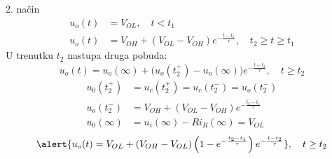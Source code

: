 \begin{frame}[label=08-s061]{2. način}
\setlength{\parskip}{2pt}
\setlength{\abovedisplayskip}{4pt}\setlength{\belowdisplayskip}{4pt}
\begin{align*}
u_o(t)&=V_{OL},\quad t<t_1\\
u_o(t)&=V_{OH}+(V_{OL}-V_{OH})e^{-\frac{t-t_1}{\tau}},\quad t_2\geq t\geq t_1
\end{align*}
U trenutku $t_2$ nastupa druga pobuda:
\[u_o(t)=u_o(\infty)+\bigl(u_o(t_2^+)-u_o(\infty)\bigr)e^{-\frac{t-t_2}{\tau}},\quad t\geq t_2\]
\begin{align*}
u_0(t_2^+)&=u_c(t_2^+)=u_c(t_2^-)=u_o(t_2^-)\\
u_o(t_2^-)&=V_{OH}+(V_{OL}-V_{OH})e^{-\frac{t_2-t_1}{\tau}}\\
u_0(\infty)&=u_i(\infty)-Ri_R(\infty)=V_{OL}
\end{align*}
\[\alert{u_o(t)=V_{OL}+(V_{OH}-V_{OL})\left(1-e^{-\frac{t_2-t_1}{\tau}}\right)e^{-\frac{t-t_2}{\tau}}},\quad t\geq t_2\]
\end{frame}
